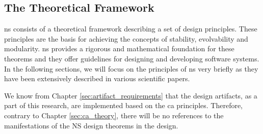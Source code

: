 \subsection{The Theoretical Framework} \label{subsec:ns_desing_theorems}

\gls{ns} consists of a theoretical framework describing a set of design principles. These
principles are the basis for achieving the concepts of stability, evolvability and
modularity. \gls{ns} provides a rigorous and mathematical foundation for these theorems
and they offer guidelines for designing and developing software systems. In the following
sections, we will focus on the principles of \gls{ns} very briefly as they have been
extensively described in various scientific papers.

We know from Chapter \ref{sec:artifact_requirements} that the design artifacts, as a part
of this research, are implemented based on the \gls{ca} principles. Therefore, contrary to
Chapter \ref{sec:ca_theory}, there will be no references to the manifestations of the NS
design theorems in the design.